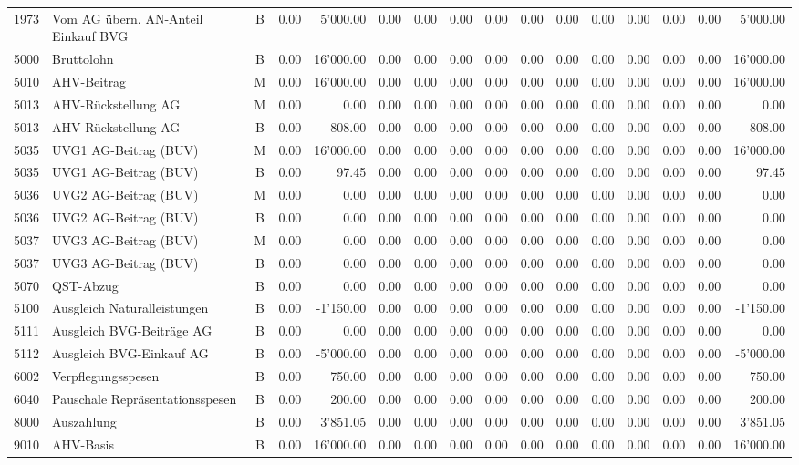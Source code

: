 \documentclass[8pt,a4paper]{extarticle}
\begin{document}
\begin{longtable}{@{\extracolsep{\fill}} l l c r r r r r r r r r r r r r}
1973&Vom AG übern. AN-Anteil Einkauf BVG&B&0.00&5'000.00&0.00&0.00&0.00&0.00&0.00&0.00&0.00&0.00&0.00&0.00&5'000.00\\
5000&Bruttolohn&B&0.00&16'000.00&0.00&0.00&0.00&0.00&0.00&0.00&0.00&0.00&0.00&0.00&16'000.00\\
5010&AHV-Beitrag&M&0.00&16'000.00&0.00&0.00&0.00&0.00&0.00&0.00&0.00&0.00&0.00&0.00&16'000.00\\
5013&AHV-Rückstellung AG&M&0.00&0.00&0.00&0.00&0.00&0.00&0.00&0.00&0.00&0.00&0.00&0.00&0.00\\
5013&AHV-Rückstellung AG&B&0.00&808.00&0.00&0.00&0.00&0.00&0.00&0.00&0.00&0.00&0.00&0.00&808.00\\
5035&UVG1 AG-Beitrag (BUV)&M&0.00&16'000.00&0.00&0.00&0.00&0.00&0.00&0.00&0.00&0.00&0.00&0.00&16'000.00\\
5035&UVG1 AG-Beitrag (BUV)&B&0.00&97.45&0.00&0.00&0.00&0.00&0.00&0.00&0.00&0.00&0.00&0.00&97.45\\
5036&UVG2 AG-Beitrag (BUV)&M&0.00&0.00&0.00&0.00&0.00&0.00&0.00&0.00&0.00&0.00&0.00&0.00&0.00\\
5036&UVG2 AG-Beitrag (BUV)&B&0.00&0.00&0.00&0.00&0.00&0.00&0.00&0.00&0.00&0.00&0.00&0.00&0.00\\
5037&UVG3 AG-Beitrag (BUV)&M&0.00&0.00&0.00&0.00&0.00&0.00&0.00&0.00&0.00&0.00&0.00&0.00&0.00\\
5037&UVG3 AG-Beitrag (BUV)&B&0.00&0.00&0.00&0.00&0.00&0.00&0.00&0.00&0.00&0.00&0.00&0.00&0.00\\
5070&QST-Abzug&B&0.00&0.00&0.00&0.00&0.00&0.00&0.00&0.00&0.00&0.00&0.00&0.00&0.00\\
5100&Ausgleich Naturalleistungen&B&0.00&-1'150.00&0.00&0.00&0.00&0.00&0.00&0.00&0.00&0.00&0.00&0.00&-1'150.00\\
5111&Ausgleich BVG-Beiträge AG&B&0.00&0.00&0.00&0.00&0.00&0.00&0.00&0.00&0.00&0.00&0.00&0.00&0.00\\
5112&Ausgleich BVG-Einkauf AG&B&0.00&-5'000.00&0.00&0.00&0.00&0.00&0.00&0.00&0.00&0.00&0.00&0.00&-5'000.00\\
6002&Verpflegungsspesen&B&0.00&750.00&0.00&0.00&0.00&0.00&0.00&0.00&0.00&0.00&0.00&0.00&750.00\\
6040&Pauschale Repräsentationsspesen&B&0.00&200.00&0.00&0.00&0.00&0.00&0.00&0.00&0.00&0.00&0.00&0.00&200.00\\
8000&Auszahlung&B&0.00&3'851.05&0.00&0.00&0.00&0.00&0.00&0.00&0.00&0.00&0.00&0.00&3'851.05\\
9010&AHV-Basis&B&0.00&16'000.00&0.00&0.00&0.00&0.00&0.00&0.00&0.00&0.00&0.00&0.00&16'000.00\\

\end{longtable}
\end{document}
